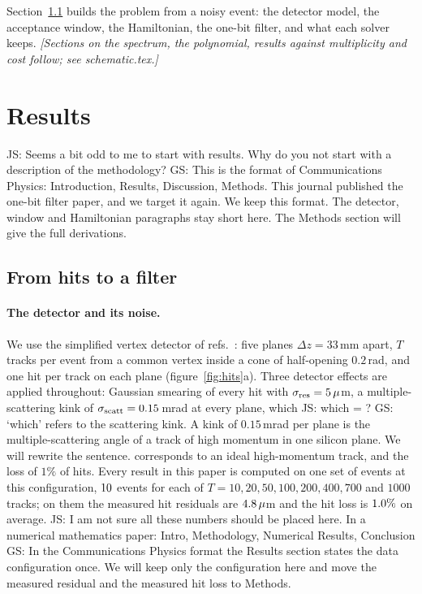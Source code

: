 \documentclass[11pt,a4paper]{article}
\newcommand{\js}[1]{{\color{blue} JS: #1 }}
\newcommand{\gs}[1]{{\color{orange!85!black} GS: #1 }}
\begin{document}
Section~\ref{sec:r1} builds the problem from a noisy event: the detector model, the acceptance
window, the Hamiltonian, the one-bit filter, and what each solver keeps.
\textit{[Sections on the spectrum, the polynomial, results against multiplicity and cost follow;
see schematic.tex.]}

\section{Results}
\js{Seems a bit odd to me to start with results. Why do you not start with a description of the methodology?} \gs{This is the format of Communications Physics: Introduction, Results, Discussion, Methods. This journal published the one-bit filter paper, and we target it again. We keep this format. The detector, window and Hamiltonian paragraphs stay short here. The Methods section will give the full derivations.}
\subsection{From hits to a filter}\label{sec:r1}

\paragraph{The detector and its noise.}
We use the simplified vertex detector of refs.~\cite{nicotra2023,trackhhl}: five planes
$\Delta z=33$\,mm apart, $T$ tracks per event from a common vertex inside a cone of half-opening
$0.2$\,rad, and one hit per track on each plane (figure~\ref{fig:hits}a). Three detector effects
are applied throughout: Gaussian smearing of every hit with $\sigma_{\rm res}=5\,\mu$m, a
multiple-scattering kink of $\sigma_{\rm scatt}=0.15$\,mrad at every plane, which \js{which = ?} \gs{`which' refers to the scattering kink. A kink of $0.15$\,mrad per plane is the multiple-scattering angle of a track of high momentum in one silicon plane. We will rewrite the sentence.} corresponds
to an ideal high-momentum track, and the loss of $1\%$ of hits. Every result in this paper is
computed on one set of events at this configuration, $10$ events for each of
$T=10,20,50,100,200,400,700$ and $1000$ tracks; on them the measured hit residuals are
$4.8\,\mu$m and the hit loss is $1.0\%$ on average. \js{I am not sure all these numbers should be placed here. In a numerical mathematics paper: Intro, Methodology, Numerical Results, Conclusion} \gs{In the Communications Physics format the Results section states the data configuration once. We will keep only the configuration here and move the measured residual and the measured hit loss to Methods.}
\end{document}
